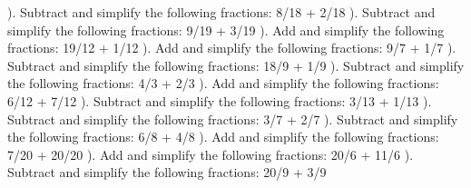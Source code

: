 \documentclass{article}%
\begin{document}
). Subtract and simplify the following fractions: 8/18 + 2/18%
\newline%
\newline%
). Subtract and simplify the following fractions: 9/19 + 3/19%
\newline%
\newline%
). Add and simplify the following fractions: 19/12 + 1/12%
\newline%
\newline%
). Add and simplify the following fractions: 9/7 + 1/7%
\newline%
\newline%
). Subtract and simplify the following fractions: 18/9 + 1/9%
\newline%
\newline%
). Subtract and simplify the following fractions: 4/3 + 2/3%
\newline%
\newline%
). Add and simplify the following fractions: 6/12 + 7/12%
\newline%
\newline%
). Subtract and simplify the following fractions: 3/13 + 1/13%
\newline%
\newline%
). Subtract and simplify the following fractions: 3/7 + 2/7%
\newline%
\newline%
). Subtract and simplify the following fractions: 6/8 + 4/8%
\newline%
\newline%
). Add and simplify the following fractions: 7/20 + 20/20%
\newline%
\newline%
). Add and simplify the following fractions: 20/6 + 11/6%
\newline%
\newline%
). Subtract and simplify the following fractions: 20/9 + 3/9%
\end{document}
